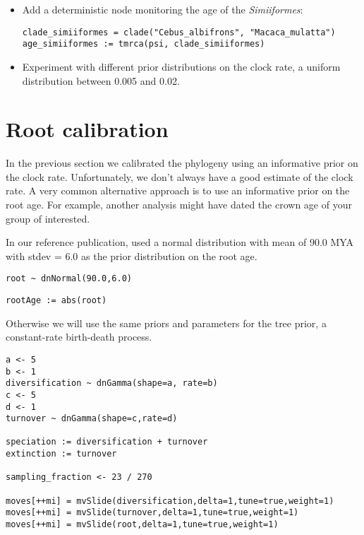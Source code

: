 \begin{itemize}
\item Add a deterministic node monitoring the age of the \emph{Simiiformes}:
{\tt \begin{snugshade*}
\begin{lstlisting}
clade_simiiformes = clade("Cebus_albifrons", "Macaca_mulatta")
age_simiiformes := tmrca(psi, clade_simiiformes)
\end{lstlisting}
\end{snugshade*}}
\item Experiment with different prior distributions on the clock rate, \EG a uniform distribution between 0.005 and 0.02.
\end{itemize}





\newpage
\section{Root calibration}

In the previous section we calibrated the phylogeny using an informative prior on the clock rate.
Unfortunately, we don't always have a good estimate of the clock rate.
A very common alternative approach is to use an informative prior on the root age. 
For example, another analysis might have dated the crown age of your group of interested.

In our reference publication, \cite{Perelman2011} used a normal distribution with mean of 90.0 MYA with stdev = 6.0 as the prior distribution on the root age.
{\tt \begin{snugshade*}
\begin{lstlisting}
root ~ dnNormal(90.0,6.0)
\end{lstlisting}
\end{snugshade*}}
{\tt \begin{snugshade*}
\begin{lstlisting}
rootAge := abs(root)
\end{lstlisting}
\end{snugshade*}}

Otherwise we will use the same priors and parameters for the tree prior, \EG a constant-rate birth-death process.
{\tt \begin{snugshade*}
\begin{lstlisting}
a <- 5
b <- 1
diversification ~ dnGamma(shape=a, rate=b)
c <- 5
d <- 1
turnover ~ dnGamma(shape=c,rate=d)

speciation := diversification + turnover
extinction := turnover

sampling_fraction <- 23 / 270

moves[++mi] = mvSlide(diversification,delta=1,tune=true,weight=1)
moves[++mi] = mvSlide(turnover,delta=1,tune=true,weight=1)
moves[++mi] = mvSlide(root,delta=1,tune=true,weight=1)
\end{lstlisting}
\end{snugshade*}}

